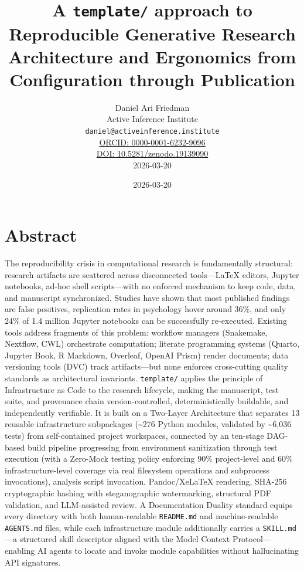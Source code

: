 \documentclass[
]{article}
\author{}
\date{}
\title{A \texttt{template/} approach to Reproducible Generative Research\\\normalsize Architecture and Ergonomics from Configuration through Publication}
\author{Daniel Ari Friedman\\\footnotesize{Active Inference Institute}\\\footnotesize{\texttt{daniel@activeinference.institute}}\\\footnotesize{\href{https://orcid.org/0000-0001-6232-9096}{ORCID: 0000-0001-6232-9096}} \\ \footnotesize{\href{https://doi.org/10.5281/zenodo.19139090}{DOI: 10.5281/zenodo.19139090}} \\ \footnotesize{2026-03-20}}
\date{2026-03-20}
\newcounter{none} %
\begin{document}
\maketitle
\thispagestyle{empty}
\tableofcontents
\newpage


\section{Abstract}\label{abstract}

The reproducibility crisis in computational research is fundamentally
structural: research artifacts are scattered across disconnected
tools---LaTeX editors, Jupyter notebooks, ad-hoc shell scripts---with no
enforced mechanism to keep code, data, and manuscript synchronized.
Studies have shown that most published findings are false positives,
replication rates in psychology hover around 36\%, and only 24\% of 1.4
million Jupyter notebooks can be successfully re-executed. Existing
tools address fragments of this problem: workflow managers (Snakemake,
Nextflow, CWL) orchestrate computation; literate programming systems
(Quarto, Jupyter Book, R Markdown, Overleaf, OpenAI Prism) render
documents; data versioning tools (DVC) track artifacts---but none
enforces cross-cutting quality standards as architectural invariants.
\texttt{template/} applies the principle of Infrastructure as Code to
the research lifecycle, making the manuscript, test suite, and
provenance chain version-controlled, deterministically buildable, and
independently verifiable. It is built on a Two-Layer Architecture that
separates 13 reusable infrastructure subpackages (\textasciitilde276
Python modules, validated by \textasciitilde6,036 tests) from
self-contained project workspaces, connected by an ten-stage DAG-based
build pipeline progressing from environment sanitization through test
execution (with a Zero-Mock testing policy enforcing 90\% project-level
and 60\% infrastructure-level coverage via real filesystem operations
and subprocess invocations), analysis script invocation, Pandoc/XeLaTeX
rendering, SHA-256 cryptographic hashing with steganographic
watermarking, structural PDF validation, and LLM-assisted review. A
Documentation Duality standard equips every directory with both
human-readable \texttt{README.md} and machine-readable
\texttt{AGENTS.md} files, while each infrastructure module additionally
carries a \texttt{SKILL.md}---a structured skill descriptor aligned with
the Model Context Protocol---enabling AI agents to locate and invoke
module capabilities without hallucinating API signatures.
\end{document}
